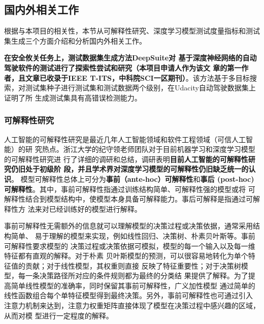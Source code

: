 \subsection{国内外相关工作}\label{relatedwork}


根据与本项目的相关性，本节从可解释性研究、深度学习模型测试度量指标和测试集生成三个方面介绍和分析国内外相关工作。

\textbf{在安全攸关任务上，测试数据集生成方法DeepSuite对
基于深度神经网络的自动驾驶软件的测试进行了探索性尝试和研究（本项目申请人作为该文
章的第一作者，且文章已收录于IEEE T-ITS，中科院SCI一区期刊）}。该方法基于多目标搜
索，对测试集种子进行测试集和测试数据两个级别，在Udacity自动驾驶数据集上证明了所
生成测试集具有高错误检测能力。





\subsubsection{可解释性研究}
{人工智能的可解释性研究是最近几年人工智能领域和软件工程领域（可信人工智能）的研
究热点}。浙江大学的纪守领老师团队对于目前机器学习和深度学习模型的可解释性研究进
行了详细的调研和总结，调研表明\textbf{目前人工智能的可解释性研究仍旧处于初级阶
段，并且学术界对深度学习模型的可解释性仍旧缺乏统一的认识}。
模型可解释性总体上可分为\textbf{事前（ante-hoc）可解释性}和\textbf{事后
(post-hoc)可解释性}。其中，事前可解释性指通过训练结构简单、可解释性强的模型或将
可解释性结合到模型结构中，使模型本身具备可解释能力。事后可解释是指通过可解释性方
法来对已经训练好的模型进行解释。

事前可解释性无需额外的信息就可以理解模型的决策过程或决策依据，通常采用结构简单、
易于理解的模型来实现，例如线性回归、决策树、朴素贝叶斯等。事前可解释性要求模型的
决策过程或决策依据可模拟，模型的每一个输入以及每一维特征都有直观的解释。对于朴素
贝叶斯模型的预测，可以很容易地转化为单个特征值的贡献；对于线性模型，其权重则直接
反映了特征重要性；对于决策树模型，每一条决策路径所对应的条件规则都为最终的分类结
果提供了解释。为了提高简单线性模型的准确率，同时保留其事前可解释性，广义加性模型
通过简单的线性函数组合每个单特征模型得到最终决策。另外，事前可解释性也可通过引入
注意力机制来达到，注意力权重矩阵直接体现了模型在决策过程中感兴趣的区域，从而对模
型进行一定程度的解释。


